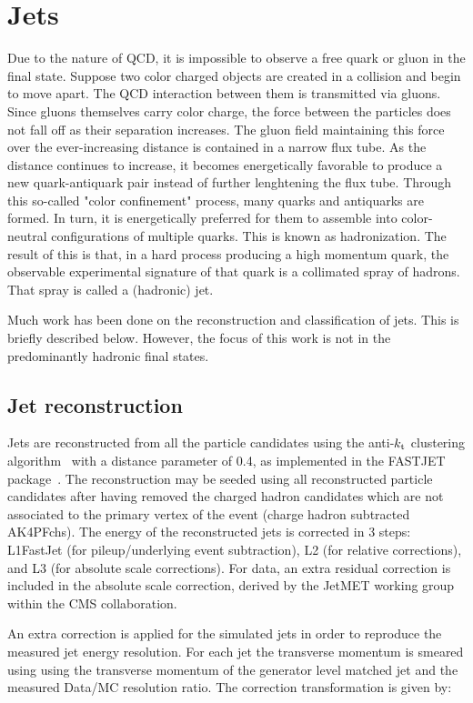 \section{Jets}
\label{sec:jets}
Due to the nature of QCD, it is impossible to observe a free quark or gluon in the final state.
Suppose two color charged objects are created in a collision and begin to move apart.
The QCD interaction between them is transmitted via gluons.
Since gluons themselves carry color charge, the force between the particles does not fall off as their separation increases.
The gluon field maintaining this force over the ever-increasing distance is contained in a narrow flux tube.
As the distance continues to increase, it becomes energetically favorable to produce a new quark-antiquark pair instead of further lenghtening the flux tube.
Through this so-called "color confinement" process, many quarks and antiquarks are formed.
In turn, it is energetically preferred for them to assemble into color-neutral configurations of multiple quarks. This is known as hadronization.
The result of this is that, in a hard process producing a high momentum quark, the observable
experimental signature of that quark is a collimated spray of hadrons. That spray is called a (hadronic) jet.

Much work has been done on the reconstruction and classification of jets.
This is briefly described below.
However, the focus of this work is not in the predominantly hadronic final states.

\subsection{Jet reconstruction}
Jets are reconstructed from all the particle candidates using the anti-$k_{\rm t}$ clustering algorithm~\cite{Cacciari:2008gp}
with a distance parameter of 0.4, as implemented in the FASTJET package~\cite{Cacciari:2011ma,Cacciari:2006gp}.
The reconstruction may be seeded using all reconstructed particle candidates
after having removed the charged hadron candidates which are not associated to the primary vertex of the event
(charge hadron subtracted AK4PFchs).
The energy of the reconstructed jets is corrected in 3 steps: L1FastJet (for pileup/underlying event subtraction),
L2 (for relative corrections), and L3 (for absolute scale corrections).
For data, an extra residual correction is included in the absolute scale correction,
derived by the JetMET working group within the CMS collaboration.

An extra correction is applied for the simulated jets in order to reproduce the measured jet energy resolution.
For each jet the transverse momentum is smeared using using the transverse momentum of
the generator level matched jet and the measured Data/MC resolution ratio. The correction transformation is given by: 

